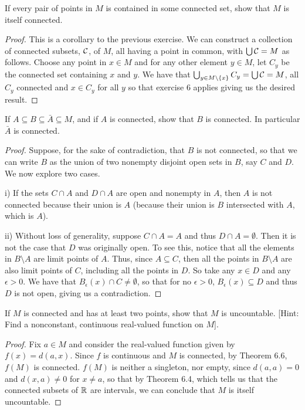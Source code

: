 \begin{exercise}{7}
If every pair of points in $M$ is contained in some connected set, show that $M$ is itself connected.
\end{exercise}
\begin{proof}
This is a corollary to the previous exercise.
We can construct a collection of connected subsets, $\mathcal{C}$, of $M$, all having a point in common, with $\bigcup\mathcal{C}=M$ as follows.
Choose any point in $x\in M$ and for any other element $y\in M$, let $C_y$ be the connected set containing $x$ and $y$.
We have that $\bigcup_{y\in M\setminus\{x\}}C_y =\bigcup\mathcal{C} =M$, all $C_y$ connected and $x\in C_y$ for all $y$ so that exercise 6 applies giving us the desired result.
\end{proof} 

\begin{exercise}{9}
If $A \subseteq B \subseteq \bar{A} \subseteq M$, and if $A$ is connected, show that $B$ is connected.
In particular $\bar{A}$ is connected.
\end{exercise}
\begin{proof}
Suppose, for the sake of contradiction, that $B$ is not connected, so that we can write $B$ as the union of two nonempty disjoint open sets in $B$, say $C$ and $D$.
We now explore two cases.

i) If the sets $C\cap A$ and $D\cap A$ are open and nonempty in $A$, then $A$ is not connected because their union is $A$ (because their union is $B$ intersected with $A$, which is $A$).

ii) Without loss of generality, suppose $C\cap A=A$ and thus $D\cap A=\emptyset$. 
Then it is not the case that $D$ was originally open.
To see this, notice that all the elements in $B\setminus A$ are limit points of $A$.
Thus, since $A\subseteq C$, then all the points in $B\setminus A$ are also limit points of $C$, including all the points in $D$.
So take any $x\in D$ and any $\epsilon>0$. 
We have that $B_\epsilon(x)\cap C\neq\emptyset$, so that for no $\epsilon>0$, $B_\epsilon(x)\subseteq D$ and thus $D$ is not open, giving us a contradiction.
\end{proof} 

\begin{exercise}{12}
If $M$ is connected and has at least two points, show that $M$ is uncountable.
[Hint: Find a nonconstant, continuous real-valued function on $M$].
\end{exercise}
\begin{proof}
Fix $a\in M$ and consider the real-valued function given by $f(x)=d(a,x)$.
Since $f$ is continuous and $M$ is connected, by Theorem 6.6, $f(M)$ is connected.
$f(M)$ is neither a singleton, nor empty, since $d(a,a)=0$ and $d(x,a)\neq 0$ for $x\neq a$, so that by Theorem 6.4, which tells us that the connected subsets of $\mathbb{R}$ are intervals, we can conclude that $M$ is itself uncountable.
\end{proof} 


